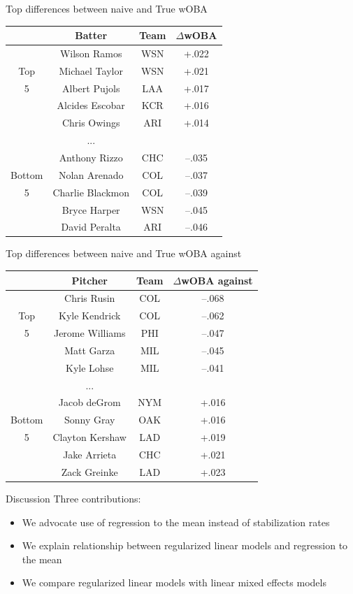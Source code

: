 \documentclass{beamer}
\begin{document}
\begin{frame}{Top differences between naive and True wOBA}
\centering
\scriptsize
\hspace*{-0.5cm}
\begin{tabular}{c|ccc}
      &Batter      &Team& $\Delta$wOBA\\
\hline
      &Wilson Ramos    &WSN & +.022\\
Top   &Michael Taylor  &WSN & +.021\\
5     &Albert Pujols   &LAA & +.017\\
      &Alcides Escobar &KCR & +.016\\
      &Chris Owings    &ARI & +.014\\
      & ...            &    &      \\
      &Anthony Rizzo   &CHC &--.035\\
Bottom&Nolan Arenado   &COL &--.037\\
5     &Charlie Blackmon&COL &--.039\\
      &Bryce Harper    &WSN &--.045\\
      &David Peralta   &ARI &--.046
\end{tabular}
\end{frame}

\begin{frame}{Top differences between naive and True wOBA against}
\centering
\scriptsize
\hspace*{-0.5cm}
\begin{tabular}{c|ccc}
      &Pitcher     &Team&$\Delta$wOBA against\\
\hline
      &Chris Rusin    &COL &--.068\\
Top   &Kyle Kendrick  &COL &--.062\\
5     &Jerome Williams&PHI &--.047\\
      &Matt Garza     &MIL &--.045\\
      &Kyle Lohse     &MIL &--.041\\
      &...            &    &      \\
      &Jacob deGrom   &NYM & +.016\\
Bottom&Sonny Gray     &OAK & +.016\\
5     &Clayton Kershaw&LAD & +.019\\
      &Jake Arrieta   &CHC & +.021\\
      &Zack Greinke   &LAD & +.023
\end{tabular}
\end{frame}

\begin{frame}{Discussion}
Three contributions:
\begin{itemize}
\item We advocate use of regression to the mean instead of stabilization rates
\item We explain relationship between regularized linear models and regression
    to the mean
\item We compare regularized linear models with linear mixed effects models
\end{itemize}
\end{frame}
\end{document}
